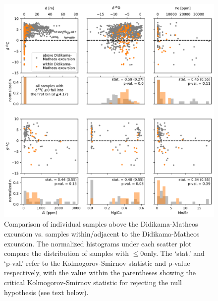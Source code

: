 \begin{figure}[h!]
\begin{center}
	\includegraphics[width=\textwidth]{figures/Tambien/siliciclastic-filtering-DidiMath-excursion.pdf}
	\caption{Comparison of individual samples above the Didikama-Matheos excursion vs. samples within/adjacent to the Didikama-Matheos excursion. The normalized histograms under each scatter plot compare the distribution of samples with \dC$\leq$0\permil only. The `stat.' and `p-val.' refer to the Kolmogorov-Smirnov statistic and p-value respectively, with the value within the parentheses showing the critical Kolmogorov-Smirnov statistic for rejecting the null hypothesis (see text below).}
	\label{fig:siliciclastic-filtering-DidiMath-excursion}
\end{center}
\end{figure}

\clearpage

